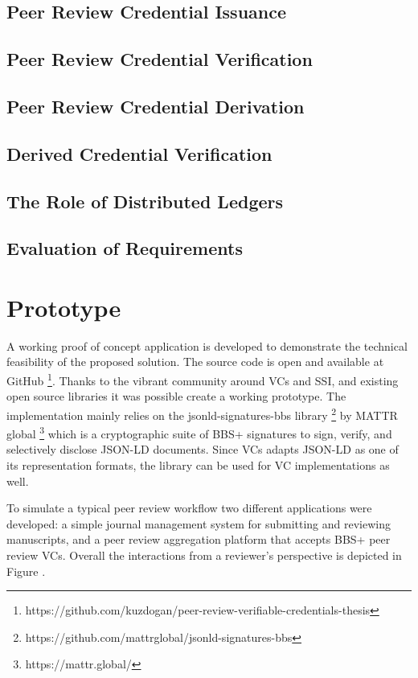 \subsection{Peer Review Credential Issuance}


\subsection{Peer Review Credential Verification}


\subsection{Peer Review Credential Derivation}


\subsection{Derived Credential Verification}

\subsection{The Role of Distributed Ledgers}

\subsection{Evaluation of Requirements}















\section{Prototype}

A working proof of concept application is developed to demonstrate the technical feasibility of the proposed solution. The source code is open and available at GitHub \footnote{https://github.com/kuzdogan/peer-review-verifiable-credentials-thesis}. Thanks to the vibrant community around VCs and SSI, and existing open source libraries it was possible create a working prototype. The implementation mainly relies on the jsonld-signatures-bbs library \footnote{https://github.com/mattrglobal/jsonld-signatures-bbs} by MATTR global \footnote{https://mattr.global/} which is a cryptographic suite of BBS+ signatures to sign, verify, and selectively disclose JSON-LD documents. Since VCs adapts JSON-LD as one of its representation formats, the library can be used for VC implementations as well.

To simulate a typical peer review workflow two different applications were developed: a simple journal management system for submitting and reviewing manuscripts, and a peer review aggregation platform that accepts BBS+ peer review VCs. Overall the interactions from a reviewer's perspective is depicted in Figure .
